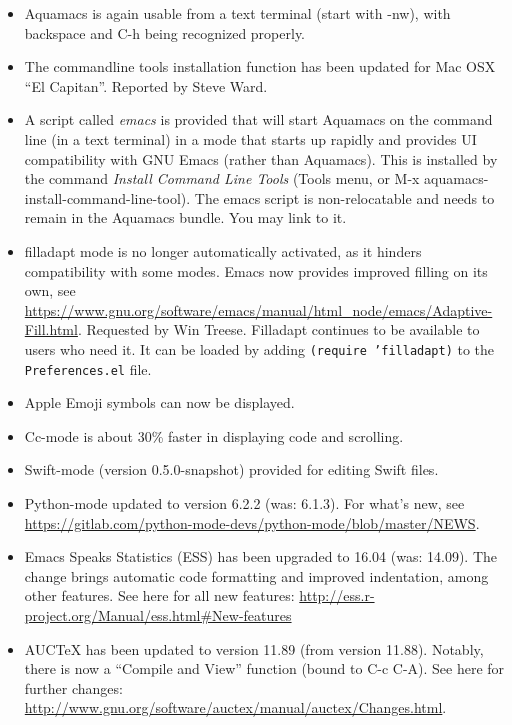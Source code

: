\begin{itemize}
\item Aquamacs is again usable from a text terminal (start with -nw), with backspace and C-h being recognized properly.
\item The commandline tools installation function has been updated for Mac OSX ``El Capitan''.
Reported by Steve Ward.
\item A script called \emph{emacs} is provided that will start Aquamacs on the command line (in a text terminal) in a mode that starts up rapidly and provides UI compatibility with GNU Emacs (rather than Aquamacs).  This is installed by the command \emph{Install Command Line Tools} (Tools menu, or M-x aquamacs-install-command-line-tool).  The emacs script is non-relocatable and needs to remain in the Aquamacs bundle.  You may link to it.
\item filladapt mode is no longer automatically activated, as it hinders compatibility with some modes.  Emacs now provides improved filling on its own, see \url{https://www.gnu.org/software/emacs/manual/html_node/emacs/Adaptive-Fill.html}.  Requested by Win Treese.   Filladapt continues to be available to users who need it.  It can be loaded by adding {\tt (require 'filladapt)} to the {\tt Preferences.el} file.
\item Apple Emoji symbols can now be displayed.

\item Cc-mode is about 30\% faster in displaying code and scrolling.
\item Swift-mode (version 0.5.0-snapshot) provided for editing Swift files.
\item Python-mode updated to version 6.2.2 (was: 6.1.3).  For what's new, see \url{https://gitlab.com/python-mode-devs/python-mode/blob/master/NEWS}.
\item Emacs Speaks Statistics (ESS) has been upgraded to 16.04 (was: 14.09).  The change brings automatic code formatting and improved indentation, among other features. See here for all new features: \url{http://ess.r-project.org/Manual/ess.html#New-features}
\item AUCTeX has been updated to version 11.89 (from version 11.88).  Notably, there is now a ``Compile and View'' function (bound to C-c C-A).  See here for further changes:  \url{http://www.gnu.org/software/auctex/manual/auctex/Changes.html}.


\end{itemize}

